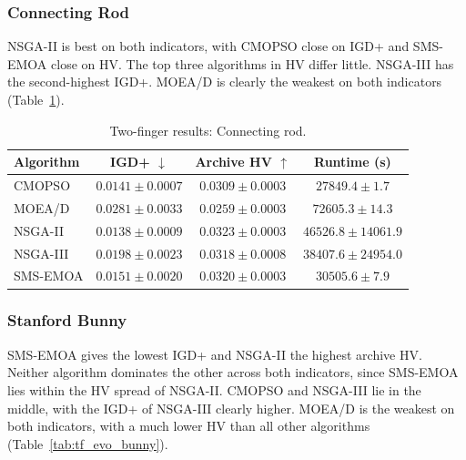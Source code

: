 \subsubsection{Connecting Rod}
\label{subsubsec:results_tf_connecting_rod}

NSGA-II is best on both indicators, with CMOPSO close on IGD+ and SMS-EMOA close on HV. The
top three algorithms in HV differ little. NSGA-III has the second-highest IGD+. MOEA/D is
clearly the weakest on both indicators (Table~\ref{tab:tf_evo_connecting_rod}).

\begin{table}[htbp]
    \centering
    \caption{Two-finger results: Connecting rod.}
    \label{tab:tf_evo_connecting_rod}
    \begin{tabular}{@{}lccc@{}}
        \toprule
        \textbf{Algorithm} & \textbf{IGD+} $\downarrow$ & \textbf{Archive HV} $\uparrow$ & \textbf{Runtime (s)} \\
        \midrule
        CMOPSO   & $0.0141 \pm 0.0007$ & $0.0309 \pm 0.0003$ & $27849.4 \pm 1.7$ \\
        MOEA/D   & $0.0281 \pm 0.0033$ & $0.0259 \pm 0.0003$ & $72605.3 \pm 14.3$ \\
        NSGA-II  & {\boldmath$0.0138 \pm 0.0009$} & {\boldmath$0.0323 \pm 0.0003$} & $46526.8 \pm 14061.9$ \\
        NSGA-III & $0.0198 \pm 0.0023$ & $0.0318 \pm 0.0008$ & $38407.6 \pm 24954.0$ \\
        SMS-EMOA & $0.0151 \pm 0.0020$ & $0.0320 \pm 0.0003$ & $30505.6 \pm 7.9$ \\
        \bottomrule
    \end{tabular}
\end{table}

\subsubsection{Stanford Bunny}
\label{subsubsec:results_tf_bunny}

SMS-EMOA gives the lowest IGD+ and NSGA-II the highest archive HV. Neither algorithm dominates
the other across both indicators, since SMS-EMOA lies within the HV spread of NSGA-II. CMOPSO
and NSGA-III lie in the middle, with the IGD+ of NSGA-III clearly higher. MOEA/D is the weakest
on both indicators, with a much lower HV than all other algorithms
(Table~\ref{tab:tf_evo_bunny}).

